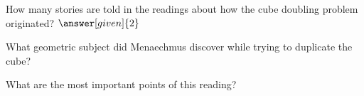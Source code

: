 \documentclass{ximera}
\begin{document}
\begin{question}
How many stories are told in the readings about how the cube doubling problem originated?  $\answer[given]{2}$
\end{question}



\begin{question}
What geometric subject did Menaechmus discover while trying to duplicate the cube?
\begin{multipleChoice}
\end{multipleChoice}
\end{question}


\begin{question}
What are the most important points of this reading?
\begin{freeResponse}
\end{freeResponse}
\end{question}
\end{document}

